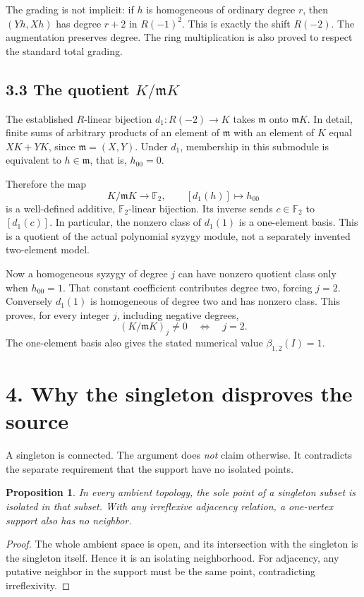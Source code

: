 \documentclass[11pt]{article}
\newtheorem{proposition}{Proposition}
\newcommand{\F}{\mathbb F_2}
\newcommand{\m}{\mathfrak m}
\begin{document}
The grading is not implicit: if $h$ is homogeneous of ordinary degree $r$,
then $(Yh,Xh)$ has degree $r+2$ in $R(-1)^2$. This is exactly the shift
$R(-2)$. The augmentation preserves degree. The ring multiplication is also
proved to respect the standard total grading.

\subsection*{3.3 The quotient $K/\m K$}
The established $R$-linear bijection
$d_1:R(-2)\longrightarrow K$ takes $\m$ onto $\m K$.
In detail, finite sums of arbitrary products of an element of $\m$ with an
element of $K$ equal $XK+YK$, since $\m=(X,Y)$. Under $d_1$, membership in this
submodule is equivalent to $h\in\m$, that is, $h_{00}=0$.

Therefore the map
\[
 K/\m K\longrightarrow\F,\qquad [d_1(h)]\longmapsto h_{00}
\]
is a well-defined additive, $\F$-linear bijection. Its inverse sends
$c\in\F$ to $[d_1(c)]$. In particular, the nonzero class of $d_1(1)$ is a
one-element basis. This is a quotient of the actual polynomial syzygy module,
not a separately invented two-element model.

Now a homogeneous syzygy of degree $j$ can have nonzero quotient class only
when $h_{00}=1$. That constant coefficient contributes degree two, forcing
$j=2$. Conversely $d_1(1)$ is homogeneous of degree two and has nonzero class.
This proves, for every integer $j$, including negative degrees,
\[
 (K/\m K)_j\ne0\quad\Longleftrightarrow\quad j=2.
\]
The one-element basis also gives the stated numerical value
$\beta_{1,2}(I)=1$.

\newpage
\section*{4. Why the singleton disproves the source}
A singleton is connected. The argument does \emph{not} claim otherwise.
It contradicts the separate requirement that the support have no isolated
points.

\begin{proposition}
In every ambient topology, the sole point of a singleton subset is isolated
in that subset. With any irreflexive adjacency relation, a one-vertex support
also has no neighbor.
\end{proposition}
\begin{proof}
The whole ambient space is open, and its intersection with the singleton is
the singleton itself. Hence it is an isolating neighborhood. For adjacency,
any putative neighbor in the support must be the same point, contradicting
irreflexivity.
\end{proof}
\end{document}
